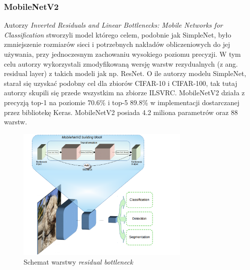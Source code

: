 \documentclass[
    left=2.5cm,         %
    right=2.5cm,        %
    top=2.5cm,          %
    bottom=3cm,         %
    bindingoffset=6mm,  %
    nohyphenation=false %
]{eiti/eiti-thesis}
\begin{document}
        \subsubsection{MobileNetV2}\label{MobileNetV2}
            Autorzy \textit{Inverted Residuals and Linear Bottlenecks: Mobile Networks for Classification}\cite{DBLP:journals/corr/abs-1801-04381}
            stworzyli model którego celem, podobnie jak SimpleNet, było zmniejszenie rozmiarów sieci i potrzebnych nakładów obliczeniowych
            do jej używania, przy jednoczesnym zachowaniu wysokiego poziomu precyzji. W tym celu autorzy wykorzystali
            zmodyfikowaną wersję warstw rezydualnych (z ang. residual layer) z takich modeli jak np. ResNet\cite{DBLP:journals/corr/HeZR016}.
            O ile autorzy modelu SimpleNet, starał się uzyskać
            podobny cel dla zbiorów CIFAR-10 i CIFAR-100, tak tutaj autorzy skupili się przede wszystkim na zbiorze ILSVRC.
            MobileNetV2 działa z precyzją top-1 na poziomie 70.6\% i top-5 89.8\% w implementacji dostarczanej przez bibliotekę Keras.
            MobileNetV2 posiada 4.2 miliona parametrów oraz 88 warstw.

            \begin{figure}[H]
            \centering
            \caption{Schemat warstwy \textit{residual bottleneck}}
            \includegraphics[width=0.75\textwidth]{eiti/mobilenetv2_overview.png}
            \end{figure}
\end{document}
